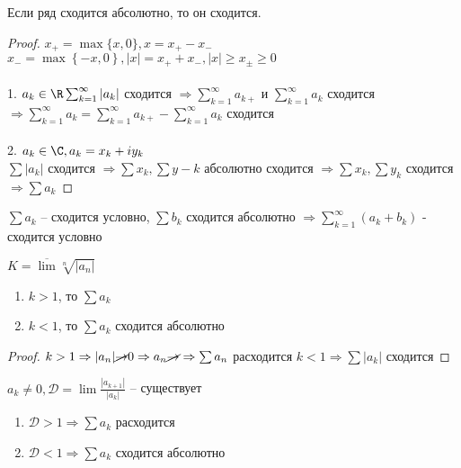 \begin{Cons}
	Если ряд сходится абсолютно, то он сходится. 
\end{Cons}

\begin{proof}
	$x_+ = \max\{x,0\}, x = x_+-x_-$\\
	$x_- = \max \left\{ -x, 0\right\}, |x| = x_+ + x_-, |x| \geqslant x_{\pm} \geqslant 0$\\ \\
	1. $a_k \in \R\\ 
	\sum_{k=1}^{\infty} |a_k|$ сходится $\Rightarrow \sum_{k=1}^{\infty} a_{k+}$ и 
	$\sum_{k=1}^{\infty} a_k$ сходится $\Rightarrow \sum_{k=1}^{\infty} a_k = \sum_{k=1}^{\infty} a_{k+} - 
	\sum_{k=1}^{\infty} a_k$ сходится \\ \\
	2. $a_k \in \C, a_k = x_k + i y_k$\\
	$\sum |a_k|$ сходится $\Rightarrow \sum x_k, \sum y-k$ абсолютно сходится $\Rightarrow
	\sum x_k, \sum y_k$ сходится $\Rightarrow \sum a_k$ 
\end{proof}

\begin{Rem}
	$\sum a_k$ -- сходится условно, $\sum b_k$ сходится абсолютно $\Rightarrow
	\sum_{k=1}^{\infty} (a_k + b_k)$ - сходится условно
\end{Rem}

\begin{Thm} 
	$K = \overline{\lim} \sqrt[n]{|a_n|}$
	\begin{enumerate}
		\item $k > 1$, то $\sum a_k$
		\item $k<1$, то $\sum a_k$ сходится абсолютно 
	\end{enumerate}
\end{Thm} 

\begin{proof}
	$k>1 \Rightarrow |a_n| \cancel{\to} 0 \Rightarrow a_n \cancel{\to} \Rightarrow \sum a_n$ расходится
	$k < 1 \Rightarrow \sum |a_k|$ сходится
\end{proof}

\begin{Thm}
	$a_k \neq 0, \mathcal{D} = \lim \frac{|a_{k+1}|}{|a_k|}$ -- существует 
	\begin{enumerate}
		\item $\mathcal{D} > 1 \Rightarrow \sum a_k$ расходится
		\item $\mathcal{D} < 1 \Rightarrow \sum a_k$ сходится абсолютно
	\end{enumerate}
\end{Thm} 

